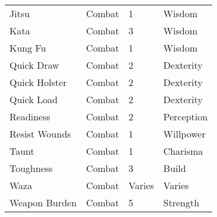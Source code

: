 \documentclass[twoside]{book}
\begin{document}
\begin{longtable}{p{1.25in}lll}
  \raggedright
           Jitsu 
  &
   Combat 
  &
   1 
  &
   Wisdom 
  \tabularnewline
      
  \raggedright
           Kata 
  &
   Combat 
  &
   3 
  &
   Wisdom 
  \tabularnewline
      
  \raggedright
           Kung Fu 
  &
   Combat 
  &
   1 
  &
   Wisdom 
  \tabularnewline
      
  \raggedright
           Quick Draw 
  &
   Combat 
  &
   2 
  &
   Dexterity 
  \tabularnewline
      
  \raggedright
           Quick Holster 
  &
   Combat 
  &
   2 
  &
   Dexterity 
  \tabularnewline
      
  \raggedright
           Quick Load 
  &
   Combat 
  &
   2 
  &
   Dexterity 
  \tabularnewline
      
  \raggedright
           Readiness 
  &
   Combat 
  &
   2 
  &
   Perception 
  \tabularnewline
      
  \raggedright
           Resist Wounds 
  &
   Combat 
  &
   1 
  &
   Willpower 
  \tabularnewline
      
  \raggedright
           Taunt 
  &
   Combat 
  &
   1 
  &
   Charisma 
  \tabularnewline
      
  \raggedright
           Toughness 
  &
   Combat 
  &
   3 
  &
   Build 
  \tabularnewline
      
  \raggedright
           Waza 
  &
   Combat 
  &
   Varies 
  &
   Varies 
  \tabularnewline
      
  \raggedright
           Weapon Burden 
  &
   Combat 
  &
   5 
  &
   Strength 
  \tabularnewline
      
\end{longtable}
    
\end{document}
